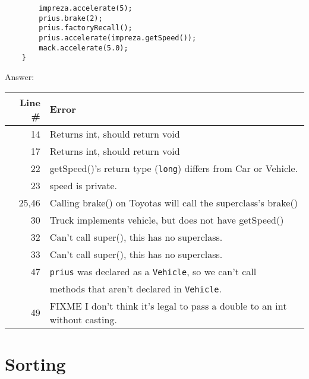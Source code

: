 \documentclass[11pt]{article}
\newenvironment{answer}{\large\lstset{basicstyle=\large}\color{white} \small{Answer:}\large}{}
\newenvironment{answer}{\large\lstset{basicstyle=\large}\color{red} \small{Answer:}\large}{}
\begin{document}
\begin{enumerate}
\begin{lstlisting}
		impreza.accelerate(5);
		prius.brake(2);
		prius.factoryRecall();
		prius.accelerate(impreza.getSpeed());
		mack.accelerate(5.0);
	}
\end{lstlisting}
\begin{answer}
    \begin{tabular}{r l} %
    Line \# & Error \\\hline
    14  	& Returns int, should return void\\
    17  	& Returns int, should return void\\
    22  	& getSpeed()'s return type ({\tt long}) differs from Car or Vehicle.\\
    23  	& speed is private.\\
    25,46	& Calling brake() on Toyotas will call the superclass's brake()\\
    30  	& Truck implements vehicle, but does not have getSpeed()\\
    32  	& Can't call super(), this has no superclass.\\
    33  	& Can't call super(), this has no superclass.\\
    47  	& {\tt prius} was declared as a {\tt Vehicle}, so we can't call\\
    ~  		& methods that aren't declared in {\tt Vehicle}.\\
    49  	& FIXME I don't think it's legal to pass a double to an int without casting.
    \end{tabular}
\end{answer}


\section*{Sorting}



\end{enumerate}
\end{document}
